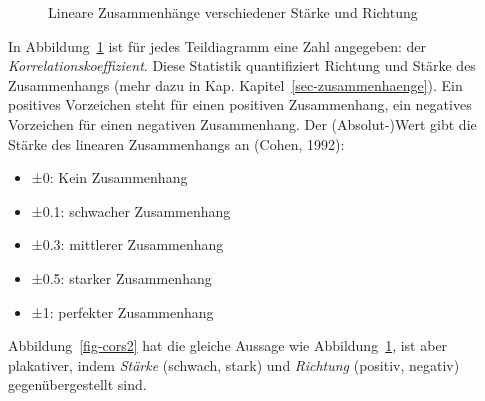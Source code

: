 \documentclass[
  letterpaper,
]{scrbook}
\providecommand{\tightlist}{%
  \setlength{\itemsep}{0pt}\setlength{\parskip}{0pt}}\usepackage{longtable,booktabs,array}
\theoremstyle{definition}
\theoremstyle{definition}
\theoremstyle{definition}
\theoremstyle{remark}
\begin{document}
\begin{figure}


\caption{\label{fig-cors}Lineare Zusammenhänge verschiedener Stärke und
Richtung}

\end{figure}%

In Abbildung~\ref{fig-cors} ist für jedes Teildiagramm eine Zahl
angegeben: der \emph{Korrelationskoeffizient}. Diese Statistik
quantifiziert Richtung und Stärke des Zusammenhangs (mehr dazu in Kap.
Kapitel~\ref{sec-zusammenhaenge}). Ein positives Vorzeichen steht für
einen positiven Zusammenhang, ein negatives Vorzeichen für einen
negativen Zusammenhang. Der (Absolut-)Wert gibt die Stärke des linearen
Zusammenhangs an (Cohen, 1992):

\begin{itemize}
\tightlist
\item
  ±0: Kein Zusammenhang
\item
  ±0.1: schwacher Zusammenhang
\item
  ±0.3: mittlerer Zusammenhang
\item
  ±0.5: starker Zusammenhang
\item
  ±1: perfekter Zusammenhang
\end{itemize}

Abbildung~\ref{fig-cors2} hat die gleiche Aussage wie
Abbildung~\ref{fig-cors}, ist aber plakativer, indem \emph{Stärke}
(schwach, stark) und \emph{Richtung} (positiv, negativ)
gegenübergestellt sind.
\end{document}
